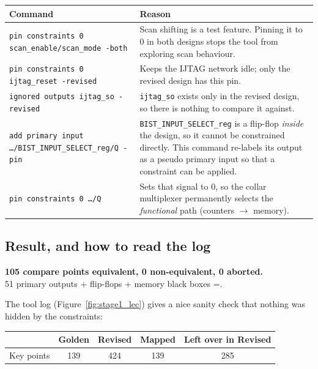 \documentclass[11pt]{article}
\newcommand{\code}[1]{\texttt{\small #1}}
\begin{document}
\begin{center}
\small
\begin{tabular}{@{}p{5.2cm}p{9.6cm}@{}}
\toprule
\textbf{Command} & \textbf{Reason} \\ \midrule
\code{pin constraints 0 scan\_enable/scan\_mode -both} & Scan shifting is a test feature. Pinning it to 0 in both designs stops the tool from exploring scan behaviour. \\
\code{pin constraints 0 ijtag\_reset -revised} & Keeps the IJTAG network idle; only the revised design has this pin. \\
\code{ignored outputs ijtag\_so -revised} & \code{ijtag\_so} exists only in the revised design, so there is nothing to compare it against. \\
\code{add primary input \ldots/BIST\_INPUT\_SELECT\_reg/Q -pin} & \code{BIST\_INPUT\_SELECT\_reg} is a flip-flop \emph{inside} the design, so it cannot be constrained directly. This command re-labels its output as a pseudo primary input so that a constraint can be applied. \\
\code{pin constraints 0 \ldots/Q} & Sets that signal to 0, so the collar multiplexer permanently selects the \emph{functional} path (counters $\to$ memory). \\ \bottomrule
\end{tabular}
\end{center}

\subsection{Result, and how to read the log}
\begin{resultbox}
\textbf{105 compare points equivalent, 0 non-equivalent, 0 aborted.}\\
51 primary outputs\; + flip-flops\; + memory black boxes\; =.
\end{resultbox}

The tool log (Figure~\ref{fig:stage1_lec}) gives a nice sanity check that nothing was hidden by the constraints:

\begin{center}
\small
\begin{tabular}{@{}lcccc@{}}
\toprule
 & \textbf{Golden} & \textbf{Revised} & \textbf{Mapped} & \textbf{Left over in Revised} \\ \midrule
Key points & 139 & 424 & 139 & 285 \\ \bottomrule
\end{tabular}
\end{center}
\end{document}
